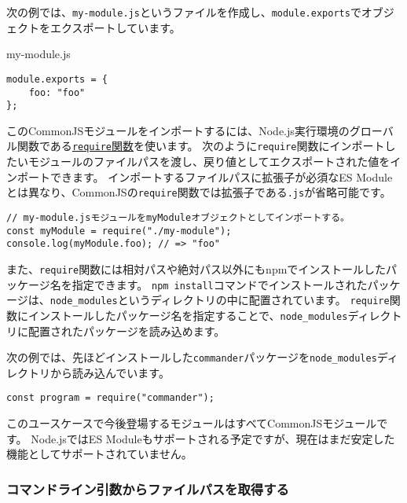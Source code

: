 次の例では、\texttt{my-module.js}というファイルを作成し、\texttt{module.exports}でオブジェクトをエクスポートしています。

\begin{listtitle}
my-module.js
\end{listtitle}
\begin{lstlisting}
module.exports = {
    foo: "foo"
};
\end{lstlisting}
\listend

このCommonJSモジュールをインポートするには、Node.js実行環境のグローバル関数である\href{https://nodejs.org/dist/latest-v12.x/docs/api/modules.html\#modules_loading_from_node_modules_folders}{\texttt{require}関数}を使います。
次のように\texttt{require}関数にインポートしたいモジュールのファイルパスを渡し、戻り値としてエクスポートされた値をインポートできます。
インポートするファイルパスに拡張子が必須なES
Moduleとは異なり、CommonJSの\texttt{require}関数では拡張子である\texttt{.js}が省略可能です。

\begin{lstlisting}
// my-module.jsモジュールをmyModuleオブジェクトとしてインポートする。
const myModule = require("./my-module");
console.log(myModule.foo); // => "foo"
\end{lstlisting}

また、\texttt{require}関数には相対パスや絶対パス以外にもnpmでインストールしたパッケージ名を指定できます。
\texttt{npm install}コマンドでインストールされたパッケージは、\texttt{node\_modules}というディレクトリの中に配置されています。
\texttt{require}関数にインストールしたパッケージ名を指定することで、\texttt{node\_modules}ディレクトリに配置されたパッケージを読み込めます。

次の例では、先ほどインストールした\texttt{commander}パッケージを\texttt{node\_modules}ディレクトリから読み込んでいます。

\begin{lstlisting}
const program = require("commander");
\end{lstlisting}

このユースケースで今後登場するモジュールはすべてCommonJSモジュールです。
Node.jsではES
Moduleもサポートされる予定ですが、現在はまだ安定した機能としてサポートされていません。

\hypertarget{get-file-path}{%
\subsubsection{コマンドライン引数からファイルパスを取得する}\label{get-file-path}}

